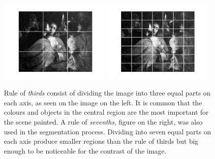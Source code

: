 \documentclass[11pt,a4paper,draft]{report}
\begin{document}
\begin{multicols}{2}
\begin{figure}[tbp]
\centering
\includegraphics[width=0.48\textwidth]{r3_L_caravaggio_1962_139_1}
\includegraphics[width=0.48\textwidth]{r7_L_caravaggio_1962_139_1}
\caption[Rule of thirds]{Rule of \emph{thirds} consist of dividing the image
into three equal parts on each axis, as seen on the image on the left.  It is
common that the colours and objects in the central region are the most
important for the scene painted.  A rule of \emph{sevenths}, figure on the
right, was also used in the segmentation process.  Dividing into seven equal
parts on each axis produce smaller regions than the rule of thirds but big
enough to be noticeable for the contrast of the image.}
\label{fig:r3}
\end{figure}


\end{multicols}
\end{document}
